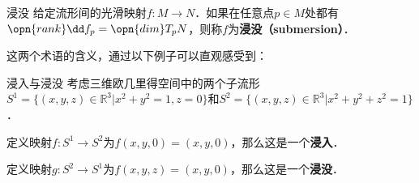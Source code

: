 \begin{definition}{浸没}
给定流形间的光滑映射$f:M\to N$．如果在任意点$p\in M$处都有$\opn{rank}\dd f_p=\opn{dim}T_pN$，则称$f$为\textbf{浸没（submersion）}．
\end{definition}

这两个术语的含义，通过以下例子可以直观感受到：

\begin{example}{浸入与浸没}
考虑三维欧几里得空间中的两个子流形$S^1=\{(x, y, z)\in\mathbb{R}^3|x^2+y^2=1, z=0\}$和$S^2=\{(x, y, z)\in\mathbb{R}^3|x^2+y^2+z^2=1\}$．

定义映射$f:S^1\to S^2$为$f(x, y, 0)=(x, y, 0)$，那么这是一个\textbf{浸入}．

定义映射$g:S^2\to S^1$为$f(x, y, z)=(x, y, 0)$，那么这是一个\textbf{浸没}．
\end{example}


















